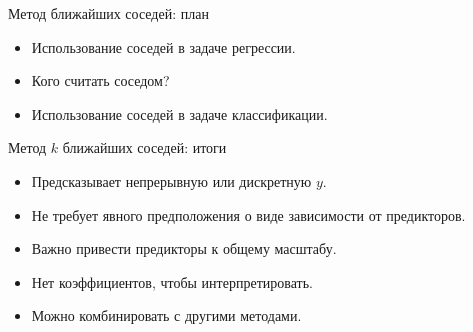
\begin{frame} %


\end{frame}



\begin{frame}{Метод ближайших соседей: план}
  \begin{itemize}[<+->]
    \item Использование соседей в задаче регрессии. 
    \item Кого считать соседом?
    \item Использование соседей в задаче классификации.
  \end{itemize}

\end{frame}


\begin{frame}{Метод $k$ ближайших соседей: итоги}

  \begin{itemize}[<+->]
    \item Предсказывает непрерывную или дискретную $y$.
    \item Не требует явного предположения \alert{о виде зависимости} от предикторов.
    \item Важно привести \alert{предикторы к общему масштабу}.
    \item \alert{Нет коэффициентов}, чтобы интерпретировать. 
    \item Можно комбинировать с другими методами.
  \end{itemize}
\end{frame}

